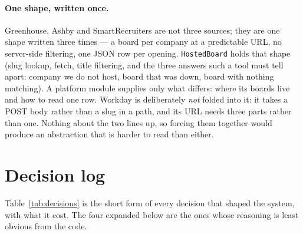 \documentclass[11pt,a4paper]{article}
\begin{document}
\paragraph{One shape, written once.} Greenhouse, Ashby and SmartRecruiters are not three
sources; they are one shape written three times --- a board per company at a predictable URL,
no server-side filtering, one JSON row per opening. \texttt{HostedBoard} holds that shape
(slug lookup, fetch, title filtering, and the three answers such a tool must tell apart:
company we do not host, board that was down, board with nothing matching). A platform module
supplies only what differs: where its boards live and how to read one row. Workday is
deliberately \emph{not} folded into it: it takes a POST body rather than a slug in a path,
and its URL needs three parts rather than one. Nothing about the two lines up, so forcing
them together would produce an abstraction that is harder to read than either.

\section{Decision log}

Table~\ref{tab:decisions} is the short form of every decision that shaped the system, with
what it cost. The four expanded below are the ones whose reasoning is least obvious from the
code.
\end{document}
